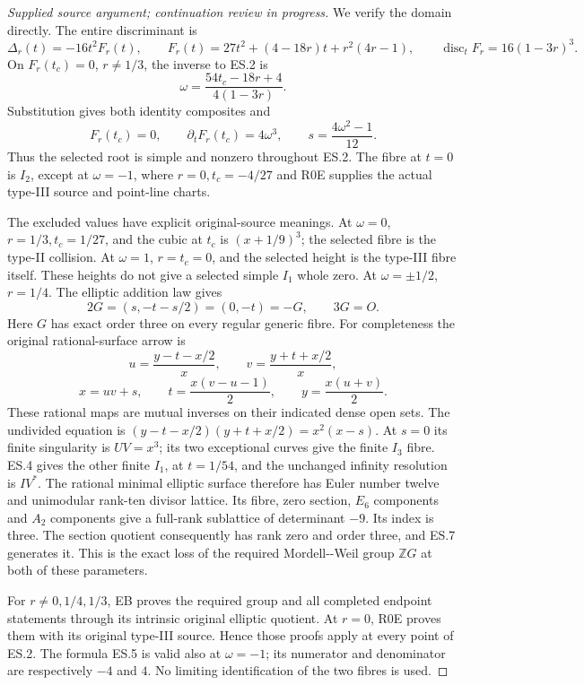 \begin{proof}[Supplied source argument; continuation review in progress]
We verify the domain directly. The entire discriminant is
\[
 \Delta_r(t)=-16t^2F_r(t),\qquad
 F_r(t)=27t^2+(4-18r)t+r^2(4r-1),
 \qquad \operatorname{disc}_tF_r=16(1-3r)^3 .
 \tag{ES.4}
\]
On \(F_r(t_c)=0\), \(r\ne1/3\), the inverse to ES.2 is
\[
 \omega=\frac{54t_c-18r+4}{4(1-3r)}.
 \tag{ES.5}
\]
Substitution gives both identity composites and
\[
 F_r(t_c)=0,\qquad
 \partial_tF_r(t_c)=4\omega^3,\qquad
 s=\frac{4\omega^2-1}{12}.
 \tag{ES.6}
\]
Thus the selected root is simple and nonzero throughout ES.2.
The fibre at \(t=0\) is \(I_2\), except at
\(\omega=-1\), where \(r=0,t_c=-4/27\) and R0E supplies the
actual type-III source and point-line charts.

The excluded values have explicit original-source meanings.
At \(\omega=0\), \(r=1/3,t_c=1/27\), and the cubic at \(t_c\)
is \((x+1/9)^3\); the selected fibre is the type-II collision.
At \(\omega=1\), \(r=t_c=0\), and the selected height is the
type-III fibre itself. These heights do not give a selected
simple \(I_1\) whole zero. At \(\omega=\pm1/2\), \(r=1/4\).
The elliptic addition law gives
\[
 2G=(s,-t-s/2)=(0,-t)=-G,\qquad 3G=O.
 \tag{ES.7}
\]
Here \(G\) has exact order three on every regular generic fibre.
For completeness the original rational-surface arrow is
\[
 u=\frac{y-t-x/2}{x},\qquad
 v=\frac{y+t+x/2}{x},
\]
\[
 x=uv+s,\qquad
 t=\frac{x(v-u-1)}2,\qquad y=\frac{x(u+v)}2.
 \tag{ES.8}
\]
These rational maps are mutual inverses on their indicated dense
open sets. The undivided equation is
\((y-t-x/2)(y+t+x/2)=x^2(x-s)\). At \(s=0\) its finite
singularity is \(UV=x^3\); its two exceptional curves give the
finite \(I_3\) fibre. ES.4 gives the other finite \(I_1\), at
\(t=1/54\), and the unchanged infinity resolution is \(IV^*\).
The rational minimal elliptic surface therefore has Euler number
twelve and unimodular rank-ten divisor lattice. Its fibre, zero
section, \(E_6\) components and \(A_2\) components give a full-rank
sublattice of determinant \(-9\). Its index is three. The section
quotient consequently has rank zero and order three, and ES.7
generates it. This is the exact loss of the required
Mordell-\/-Weil group \(\mathbb ZG\) at both of these parameters.

For \(r\ne0,1/4,1/3\), EB proves the required group and all
completed endpoint statements through its intrinsic original
elliptic quotient. At \(r=0\), R0E proves them with its original
type-III source. Hence those proofs apply at every point of ES.2.
The formula ES.5 is valid also at \(\omega=-1\); its numerator
and denominator are respectively \(-4\) and \(4\).
No limiting identification of the two fibres is used.


\end{proof}

